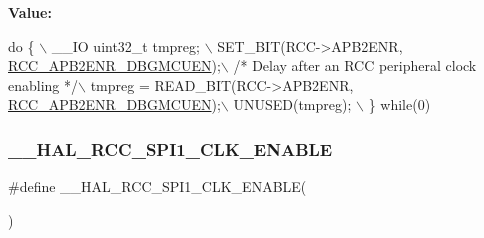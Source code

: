 {\bfseries Value\+:}
\begin{DoxyCode}
\textcolor{keywordflow}{do} \{ \(\backslash\)
                                        \_\_IO uint32\_t tmpreg; \(\backslash\)
                                        SET\_BIT(RCC->APB2ENR, 
      \hyperlink{group___peripheral___registers___bits___definition_ga87db727052e2e14b12cb728ba978ebb8}{RCC\_APB2ENR\_DBGMCUEN});\(\backslash\)
                                        \textcolor{comment}{/* Delay after an RCC peripheral clock enabling */}\(\backslash\)
                                        tmpreg = READ\_BIT(RCC->APB2ENR, 
      \hyperlink{group___peripheral___registers___bits___definition_ga87db727052e2e14b12cb728ba978ebb8}{RCC\_APB2ENR\_DBGMCUEN});\(\backslash\)
                                        UNUSED(tmpreg); \(\backslash\)
                                      \} \textcolor{keywordflow}{while}(0)
\end{DoxyCode}
\mbox{\label{group___r_c_c___a_p_b2___clock___enable___disable_ga856c7460aa481976644736c703c6702d}} 
\subsubsection{\texorpdfstring{\+\_\+\+\_\+\+H\+A\+L\+\_\+\+R\+C\+C\+\_\+\+S\+P\+I1\+\_\+\+C\+L\+K\+\_\+\+E\+N\+A\+B\+LE}{\_\_HAL\_RCC\_SPI1\_CLK\_ENABLE}}
{\footnotesize\ttfamily \#define \+\_\+\+\_\+\+H\+A\+L\+\_\+\+R\+C\+C\+\_\+\+S\+P\+I1\+\_\+\+C\+L\+K\+\_\+\+E\+N\+A\+B\+LE(\begin{DoxyParamCaption}{ }\end{DoxyParamCaption})}

